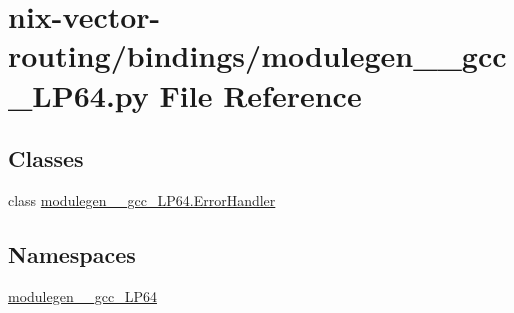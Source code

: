 \hypertarget{nix-vector-routing_2bindings_2modulegen____gcc__LP64_8py}{}\section{nix-\/vector-\/routing/bindings/modulegen\+\_\+\+\_\+gcc\+\_\+\+L\+P64.py File Reference}
\label{nix-vector-routing_2bindings_2modulegen____gcc__LP64_8py}
\subsection*{Classes}
\begin{DoxyCompactItemize}
\item 
class \hyperlink{classmodulegen____gcc__LP64_1_1ErrorHandler}{modulegen\+\_\+\+\_\+gcc\+\_\+\+L\+P64.\+Error\+Handler}
\end{DoxyCompactItemize}
\subsection*{Namespaces}
\begin{DoxyCompactItemize}
\item 
 \hyperlink{namespacemodulegen____gcc__LP64}{modulegen\+\_\+\+\_\+gcc\+\_\+\+L\+P64}
\end{DoxyCompactItemize}
